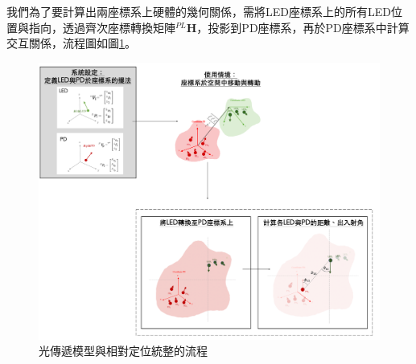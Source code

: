     我們為了要計算出兩座標系上硬體的幾何關係，需將LED座標系上的所有LED位置與指向，透過齊次座標轉換矩陣$^{PL}\boldsymbol{H}$，投影到PD座標系，再於PD座標系中計算交互關係，流程圖如圖\ref{pic:model_transform_flow}。
    

    \begin{figure}[h]
        \centering
        \includegraphics[width=15cm]{ch2pic/model_transform_flow.png}
        \caption{光傳遞模型與相對定位統整的流程}
        \label{pic:model_transform_flow}
    \end{figure}
    
